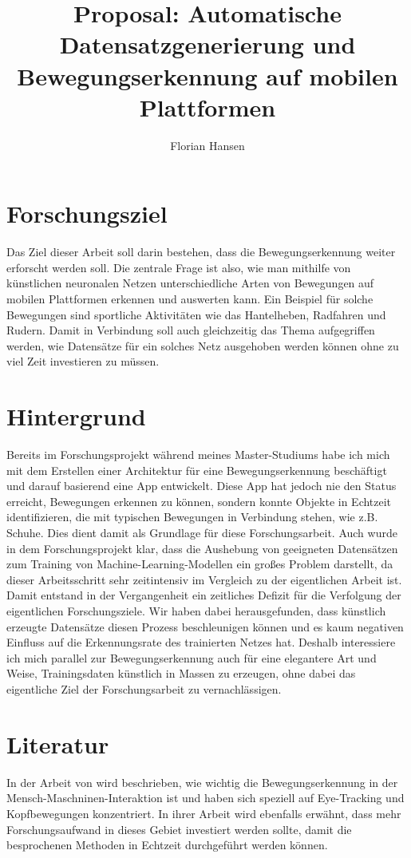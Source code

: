 \documentclass[dvipsnames,a4paper,12pt]{article}
\title{Proposal: Automatische Datensatzgenerierung und Bewegungserkennung auf mobilen Plattformen}
\author{Florian Hansen}
\begin{document}
  \maketitle

  \section{Forschungsziel} %
  Das Ziel dieser Arbeit soll darin bestehen, dass die Bewegungserkennung
  weiter erforscht werden soll. Die zentrale Frage ist also, wie man mithilfe
  von künstlichen neuronalen Netzen unterschiedliche Arten von Bewegungen auf
  mobilen Plattformen erkennen und auswerten kann. Ein Beispiel für solche
  Bewegungen sind sportliche Aktivitäten wie das Hantelheben, Radfahren und
  Rudern. Damit in Verbindung soll auch gleichzeitig das Thema aufgegriffen
  werden, wie Datensätze für ein solches Netz ausgehoben werden können ohne
  zu viel Zeit investieren zu müssen.

  \section{Hintergrund} %
  Bereits im Forschungsprojekt während meines Master-Studiums habe ich mich
  mit dem Erstellen einer Architektur für eine Bewegungserkennung
  be\-schäf\-tigt und darauf basierend eine App entwickelt. Diese App hat
  jedoch nie den Status erreicht, Bewegungen erkennen zu können, sondern konnte
  Objekte in Echtzeit identifizieren, die mit typischen Bewegungen in
  Verbindung stehen, wie z.B. Schuhe. Dies dient damit als Grundlage für diese
  Forschungsarbeit. Auch wurde in dem Forschungsprojekt klar, dass die
  Aushebung von geeigneten Datensätzen zum Training von
  Machine-Learning-Modellen ein großes Problem darstellt, da dieser
  Arbeitsschritt sehr zeitintensiv im Vergleich zu der eigentlichen Arbeit
  ist. Damit entstand in der Vergangenheit ein zeitliches Defizit für die
  Verfolgung der eigentlichen Forschungsziele. Wir haben dabei herausgefunden, dass
  künstlich erzeugte Datensätze diesen Prozess beschleunigen können und es
  kaum negativen Einfluss auf die Erkennungsrate des trainierten Netzes hat.
  Deshalb interessiere ich mich parallel zur Bewegungserkennung auch für eine
  elegantere Art und Weise, Trainingsdaten künstlich in Massen zu erzeugen, ohne
  dabei das eigentliche Ziel der Forschungsarbeit zu vernachlässigen.

  \section{Literatur} %
  In der Arbeit von \cite{Rahayfeh2013} wird beschrieben, wie wichtig die
  Bewegungserkennung in der Mensch-Maschninen-Interaktion ist und haben sich
  speziell auf Eye-Tracking und Kopfbewegungen konzentriert. In ihrer Arbeit
  wird ebenfalls erwähnt, dass mehr Forschungsaufwand in dieses Gebiet investiert
  werden sollte, damit die besprochenen Methoden in Echtzeit durchgeführt werden
  können.
\end{document}
